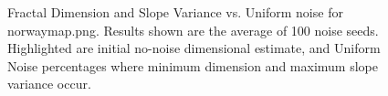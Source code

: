 \documentclass[12pt, oneside]{book}
\begin{document}
\begin{figure}[!b]
  \centering
  \caption[Fractal Dimension and Slope Variance vs. Uniform noise for norwaymap.png.]{Fractal Dimension and Slope Variance vs. Uniform noise for norwaymap.png.  Results shown are the average of 100 noise seeds.  Highlighted are initial no-noise dimensional estimate, and Uniform Noise percentages where minimum dimension and maximum slope variance occur.}
  \label{fig:norwaymap_uniform_result}
\end{figure}
\end{document}

